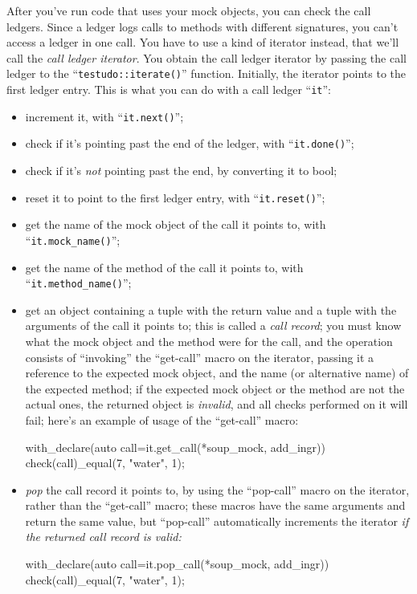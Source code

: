 \documentclass[twoside, a4paper, article]{memoir}
\begin{document}
After you've run code that uses your mock objects, you can check the call
ledgers.  Since a ledger logs calls to methods with different signatures, you
can't access a ledger in one call.  You have to use a kind of iterator instead,
that we'll call the \emph{call ledger iterator}.  You obtain the call ledger
iterator by passing the call ledger to the ``\texttt{testudo::iterate()}''
function.  Initially, the iterator points to the first ledger entry.  This is
what you can do with a call ledger ``\texttt{it}'':
\begin{itemize}
\item increment it, with ``\texttt{it.next()}'';
\item check if it's pointing past the end of the ledger, with
  ``\texttt{it.done()}'';
\item check if it's \emph{not} pointing past the end, by converting it to bool;
\item reset it to point to the first ledger entry, with
  ``\texttt{it.reset()}'';
\item get the name of the mock object of the call it points to, with
  ``\texttt{it.mock\_name()}'';
\item get the name of the method of the call it points to, with
  ``\texttt{it.method\_name()}'';
\item get an object containing a tuple with the return value and a tuple with
  the arguments of the call it points to; this is called a \emph{call record};
  you must know what the mock object and the method were for the call, and the
  operation consists of ``invoking'' the ``get-call'' macro on the iterator,
  passing it a reference to the expected mock object, and the name (or
  alternative name) of the expected method; if the expected mock object or the
  method are not the actual ones, the returned object is \emph{invalid}, and
  all checks performed on it will fail; here's an example of usage of the
  ``get-call'' macro:
\begin{cpplisting}
with_declare(auto call=it.get_call(*soup_mock, add_ingr))
  check(call)_equal({7}, {"water", 1});
\end{cpplisting}
\item \emph{pop} the call record it points to, by using the ``pop-call'' macro
  on the iterator, rather than the ``get-call'' macro; these macros have the
  same arguments and return the same value, but ``pop-call'' automatically
  increments the iterator \emph{if the returned call record is valid:}
\begin{cpplisting}
with_declare(auto call=it.pop_call(*soup_mock, add_ingr))
  check(call)_equal({7}, {"water", 1});
\end{cpplisting}
\end{itemize}
\end{document}
